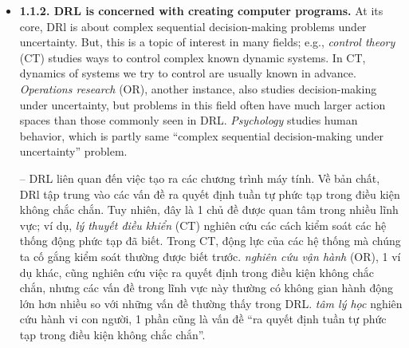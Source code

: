 \documentclass{article}
\begin{document}
\begin{itemize}
\begin{itemize}
\begin{itemize}
            {\bf DL is a powerful toolbox.} Important thing here is DL is a toolbox, \& any advancement in field of DL is felt in all of ML. DRL is intersection of RL \& DL. Bottom line: DRL is an approach to a problem. Field of AI defines problem: creating intelligent machines. 1 of approaches to solving that problem is DRL. Throughout book, will you find comparisons between RL \& other ML approaches, but only in this chap will you find definitions \& a historical overview of AI in general. Important to note: field of RL includes field of DRL, so although I make a distinction when necessary, when refer to RL, remember DRL is included.

            -- {\bf DL là 1 bộ công cụ mạnh mẽ.} Điều quan trọng ở đây là DL là 1 bộ công cụ, \& bất kỳ tiến bộ nào trong lĩnh vực DL đều được cảm nhận trong toàn bộ ML. DRL là giao điểm của RL \& DL. Tóm lại: DRL là 1 cách tiếp cận vấn đề. Lĩnh vực AI định nghĩa vấn đề: tạo ra máy móc thông minh. 1 trong những cách tiếp cận để giải quyết vấn đề đó là DRL. Xuyên suốt cuốn sách, bạn sẽ tìm thấy những so sánh giữa RL \& các cách tiếp cận ML khác, nhưng chỉ trong chương này, bạn mới tìm thấy các định nghĩa \& tổng quan về lịch sử AI nói chung. Lưu ý quan trọng: lĩnh vực RL bao gồm cả lĩnh vực DRL, vì vậy mặc dù tôi có phân biệt khi cần thiết, nhưng khi đề cập đến RL, hãy nhớ rằng DRL cũng được bao gồm.
            \item {\bf1.1.2. DRL is concerned with creating computer programs.} At its core, DRl is about complex sequential decision-making problems under uncertainty. But, this is a topic of interest in many fields; e.g., {\it control theory} (CT) studies ways to control complex known dynamic systems. In CT, dynamics of systems we try to control are usually known in advance. {\it Operations research} (OR), another instance, also studies decision-making under uncertainty, but problems in this field often have much larger action spaces than those commonly seen in DRL. {\it Psychology} studies human behavior, which is partly same ``complex sequential decision-making under uncertainty'' problem.

            -- {\sf DRL liên quan đến việc tạo ra các chương trình máy tính.} Về bản chất, DRl tập trung vào các vấn đề ra quyết định tuần tự phức tạp trong điều kiện không chắc chắn. Tuy nhiên, đây là 1 chủ đề được quan tâm trong nhiều lĩnh vực; ví dụ, {\it lý thuyết điều khiển} (CT) nghiên cứu các cách kiểm soát các hệ thống động phức tạp đã biết. Trong CT, động lực của các hệ thống mà chúng ta cố gắng kiểm soát thường được biết trước. {\it nghiên cứu vận hành} (OR), 1 ví dụ khác, cũng nghiên cứu việc ra quyết định trong điều kiện không chắc chắn, nhưng các vấn đề trong lĩnh vực này thường có không gian hành động lớn hơn nhiều so với những vấn đề thường thấy trong DRL. {\it tâm lý học} nghiên cứu hành vi con người, 1 phần cũng là vấn đề ``ra quyết định tuần tự phức tạp trong điều kiện không chắc chắn''.


\end{itemize}
\end{itemize}
\end{itemize}
\end{document}
